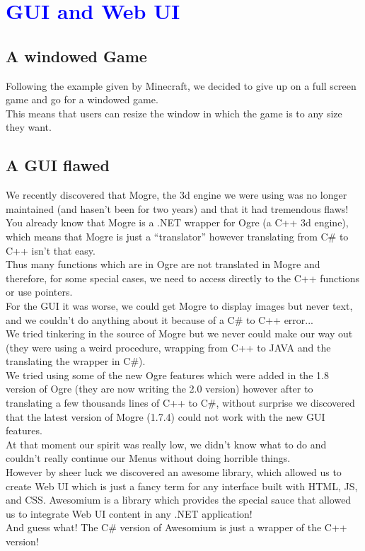 \documentclass[article]{report}         %
\begin{document}
    \chapter{\textcolor{blue}{GUI and Web UI}}
      \section{A windowed Game}
        Following the example given by Minecraft, we decided to give up on a full screen game and go for a windowed game.\\
        This means that users can resize the window in which the game is to any size they want.\\
      \section{A GUI flawed}
        We recently discovered that Mogre, the 3d engine we were using was no longer maintained (and hasen't been for two years) and that it had tremendous flaws!\\
        You already know that Mogre is a .NET wrapper for Ogre (a C++ 3d engine), which means that Mogre is just a ``translator'' however translating from C\# to C++ isn't that easy.\\
        Thus many functions which are in Ogre are not translated in Mogre and therefore, for some special cases, we need to access directly to the C++ functions or use pointers.\\

        For the GUI it was worse, we could get Mogre to display images but never text, and we couldn't do anything about it because of a C\# to C++ error...\\
        We tried tinkering in the source of Mogre but we never could make our way out (they were using a weird procedure, wrapping from C++ to JAVA and the translating the wrapper in C\#).\\
        We tried using some of the new Ogre features which were added in the 1.8 version of Ogre (they are now writing the 2.0 version) however after to translating a few thousands lines of C++ to C\#, without surprise we discovered that the latest version of Mogre (1.7.4) could not work with the new GUI features.\\

        At that moment our spirit was really low, we didn't know what to do and couldn't really continue our Menus without doing horrible things.\\
        However by sheer luck we discovered an awesome library, which allowed us to create Web UI which is just a fancy term for any interface built with HTML, JS, and CSS.
        Awesomium is a library which provides the special sauce that allowed us to integrate Web UI content in any .NET application! \\
        And guess what! The C\# version of Awesomium is just a wrapper of the C++ version!
\end{document}
